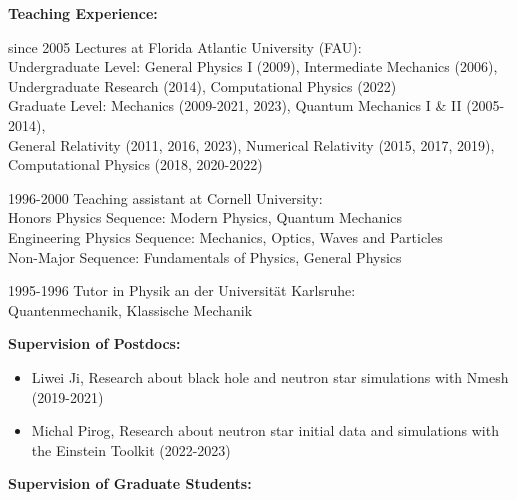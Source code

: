 \documentclass[11pt]{article}
\begin{document}
\bigskip

{\bf Teaching Experience:}

\begin{list}{}{\leftmargin=6em =1.5em \rightmargin=-8em =9em}
\item[since 2005]	Lectures at Florida Atlantic University (FAU):
\\
		Undergraduate Level:
		General Physics I (2009), Intermediate Mechanics (2006),\\
		Undergraduate Research (2014), Computational Physics (2022)
\\
		Graduate Level:
		Mechanics (2009-2021, 2023),
		Quantum Mechanics I \& II (2005-2014),\\
		General Relativity (2011, 2016, 2023),
		Numerical Relativity (2015, 2017, 2019),\\
		Computational Physics (2018, 2020-2022)
\item[1996-2000]	Teaching assistant at Cornell University:\\
		Honors Physics Sequence: Modern Physics, Quantum Mechanics\\
		Engineering Physics Sequence: Mechanics,
		Optics, Waves and Particles \\
		Non-Major Sequence: Fundamentals of Physics, 
		General Physics 
\item[1995-1996]	Tutor in Physik an der Universität Karlsruhe:\\
	Quantenmechanik, Klassische Mechanik
\end{list}


\bigskip


{\bf Supervision of Postdocs:}

\begin{itemize}
\item	Liwei Ji, Research about
	black hole and neutron star simulations with Nmesh (2019-2021)
\item	Michal Pirog, Research about
	neutron star initial data and simulations with the 
	Einstein Toolkit (2022-2023)
\end{itemize}

\medskip

{\bf Supervision of Graduate Students:}
\end{document}
